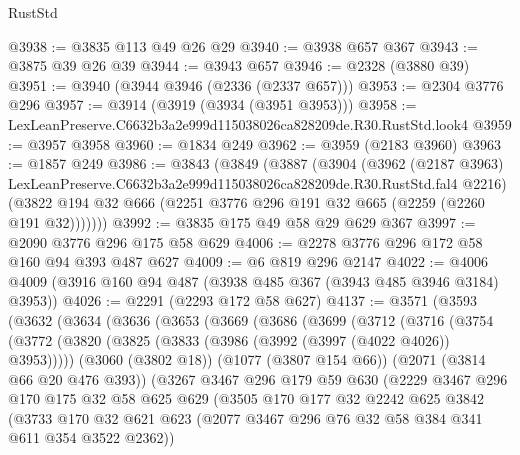 \begin{lexlean}{RustStd}
\begin{coremodule}
@3938 := @3835 @113 @49 @26 @29
@3940 := @3938 @657 @367
@3943 := @3875 @39 @26 @39
@3944 := @3943 @657
@3946 := @2328 (@3880 @39)
@3951 := @3940 (@3944 @3946 (@2336 (@2337 @657)))
@3953 := @2304 @3776 @296
@3957 := @3914 (@3919 (@3934 (@3951 @3953)))
@3958 := LexLeanPreserve.C6632b3a2e999d115038026ca828209de.R30.RustStd.look4
@3959 := @3957 @3958
@3960 := @1834 @249
@3962 := @3959 (@2183 @3960)
@3963 := @1857 @249
@3986 := @3843
    (@3849
      (@3887
        (@3904
          (@3962
            (@2187 @3963)
            LexLeanPreserve.C6632b3a2e999d115038026ca828209de.R30.RustStd.fal4
            @2216)
          (@3822 @194 @32 @666 (@2251 @3776 @296 @191 @32 @665 (@2259 (@2260 @191 @32)))))))
@3992 := @3835 @175 @49 @58 @29 @629 @367
@3997 := @2090 @3776 @296 @175 @58 @629
@4006 := @2278 @3776 @296 @172 @58 @160 @94 @393 @487 @627
@4009 := @6 @819 @296 @2147
@4022 := @4006 @4009 (@3916 @160 @94 @487 (@3938 @485 @367 (@3943 @485 @3946 @3184) @3953))
@4026 := @2291 (@2293 @172 @58 @627)
@4137 := @3571
    (@3593
      (@3632
        (@3634
          (@3636
            (@3653
              (@3669
                (@3686
                  (@3699
                    (@3712
                      (@3716
                        (@3754
                          (@3772
                            (@3820 (@3825 (@3833 (@3986 (@3992 (@3997 (@4022 @4026)) @3953)))))
                            (@3060 (@3802 @18))
                            (@1077 (@3807 @154 @66))
                            (@2071 (@3814 @66 @20 @476 @393))
                            (@3267
                              @3467
                              @296
                              @179
                              @59
                              @630
                              (@2229
                                @3467
                                @296
                                @170
                                @175
                                @32
                                @58
                                @625
                                @629
                                (@3505
                                  @170
                                  @177
                                  @32
                                  @2242
                                  @625
                                  @3842
                                  (@3733
                                    @170
                                    @32
                                    @621
                                    @623
                                    (@2077 @3467 @296 @76 @32 @58 @384 @341 @611 @354 @3522 @2362))

\end{coremodule}
\end{lexlean}
